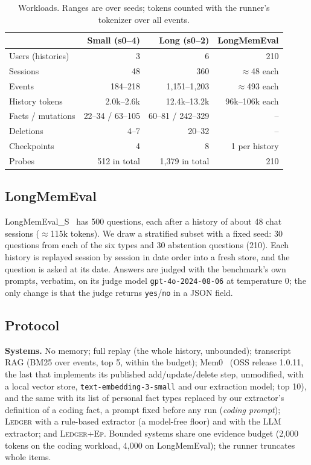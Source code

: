 \documentclass[10pt,conference]{IEEEtran}
\newcommand{\sys}{\textsc{Ledger}}
\newcommand{\hyb}{\textsc{Ledger+Ep}}
\begin{document}
\begin{table}[t]
\caption{Workloads. Ranges are over seeds; tokens counted with the runner's
tokenizer over all events.}
\label{tab:workloads}
\centering
\footnotesize
\begin{tabular}{@{}lrrr@{}}
\toprule
 & Small (s0--4) & Long (s0--2) & LongMemEval \\
\midrule
Users (histories) & 3 & 6 & 210 \\
Sessions & 48 & 360 & ${\approx}$48 each \\
Events & 184--218 & 1{,}151--1{,}203 & ${\approx}$493 each \\
History tokens & 2.0k--2.6k & 12.4k--13.2k & 96k--106k each \\
Facts / mutations & 22--34 / 63--105 & 60--81 / 242--329 & -- \\
Deletions & 4--7 & 20--32 & -- \\
Checkpoints & 4 & 8 & 1 per history \\
Probes & 512 in total & 1{,}379 in total & 210 \\
\bottomrule
\end{tabular}
\end{table}

\subsection{LongMemEval}
\label{sec:lme}

LongMemEval\_S~\cite{wu2025longmemeval} has 500 questions, each after a
history of about 48 chat sessions (${\approx}$115k tokens). We draw a
stratified subset with a fixed seed: 30 questions from each of the six types
and 30 abstention questions (210). Each history is replayed session by session
in date order into a fresh store, and the question is asked at its date.
Answers are judged with the benchmark's own prompts, verbatim, on its judge
model \texttt{gpt-4o-2024-08-06} at temperature 0; the only change is that the
judge returns \texttt{yes}/\texttt{no} in a JSON field.

\subsection{Protocol}
\label{sec:protocol}

\textbf{Systems.} No memory; full replay (the whole history, unbounded);
transcript RAG (BM25 over events, top 5, within the budget);
Mem0~\cite{chhikara2025mem0} (OSS release 1.0.11, the last that implements
its published add/update/delete step, unmodified, with a local vector store,
\texttt{text-embedding-3-small} and our extraction model; top 10), and the same
with its list of personal fact types replaced by our extractor's definition of
a coding fact, a prompt fixed before any run (\emph{coding prompt}); \sys{} with a
rule-based extractor (a model-free floor) and with the LLM extractor; and
\hyb{}. Bounded systems share one evidence budget (2{,}000 tokens on the coding
workload, 4{,}000 on LongMemEval); the runner truncates whole items.
\end{document}
